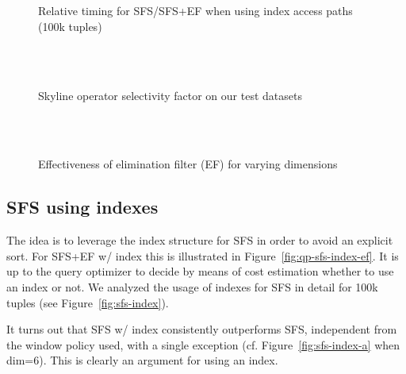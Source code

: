 \begin{figure}[htbp]
\centering%
\begin{minipage}{\onecolumnwidth}%
\\
\\
%
\caption{Relative timing for SFS/SFS+EF when using index access paths (100k tuples)}%
\label{fig:sfs-index}%
\end{minipage}%
\hspace{\columnsep}%
\begin{minipage}{\onecolumnwidth}%
\\
\\
%
\caption{Skyline operator selectivity factor on our test datasets}%
\label{fig:sf}%
\end{minipage}
\end{figure}


\begin{figure}[htbp]
\centering
{}\\
\\
%
\caption{Effectiveness of elimination filter (EF) for varying dimensions}%
\label{fig:ef-eff}%
\end{figure}

\subsection{SFS using indexes}
The idea is to leverage the index structure for SFS in order to avoid an explicit sort.
For SFS+EF w/ index this is illustrated in Figure~\ref{fig:qp-sfs-index-ef}.
It is up to the query optimizer to decide by means of cost estimation 
whether to use an index or not.
We analyzed the usage of indexes for SFS in detail for 100k tuples 
(see Figure~\ref{fig:sfs-index}).

It turns out that SFS w/ index consistently outperforms SFS, 
independent from the window policy used, with a single exception (cf. 
Figure~\ref{fig:sfs-index-a} when dim=6). 
This is clearly an argument for using an index.

